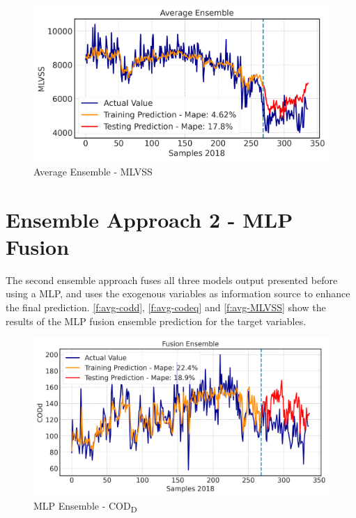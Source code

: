 \begin{figure}[h]
\centering
\includegraphics[width=\linewidth]{figures/Ch5/MVLSS-E_avg.png}
\caption{Average Ensemble - MLVSS}
\label{f:avg-MLVSS}
\end{figure}

\section{Ensemble Approach 2 - MLP Fusion}
The second ensemble approach fuses all three models output presented before using a \ac{MLP}, and uses the exogenous variables as information source to enhance the final prediction. \autoref{f:avg-codd}, \autoref{f:avg-codeq} and \autoref{f:avg-MLVSS} show the results of the \ac{MLP} fusion ensemble prediction for the target variables. 

\begin{figure}[h]
\centering
\includegraphics[width=\linewidth]{figures/Ch5/CODd-ann.png}
\caption{MLP Ensemble - COD\textsubscript{D}}
\label{f:ann-codd}
\end{figure}

